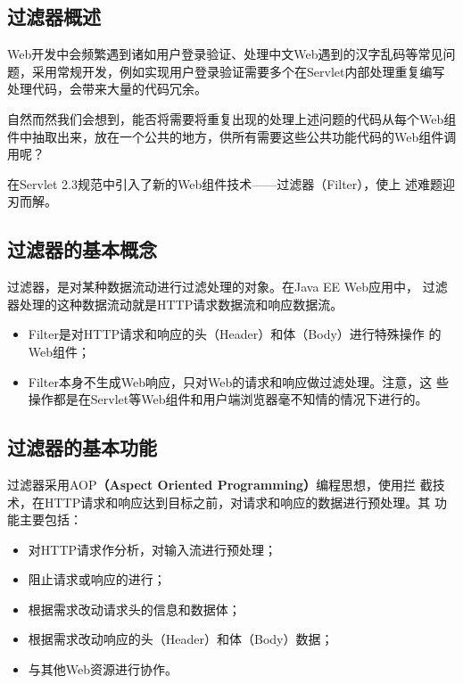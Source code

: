 \subsection{过滤器概述} 

Web开发中会频繁遇到诸如用户登录验证、处理中文Web遇到的汉字乱码等常见问
题，采用常规开发，例如实现用户登录验证需要多个在Servlet内部处理重复编写
处理代码，会带来大量的代码冗余。

自然而然我们会想到，能否将需要将重复出现的处理上述问题的代码从每个Web组
件中抽取出来，放在一个公共的地方，供所有需要这些公共功能代码的Web组件调
用呢？

在Servlet 2.3规范中引入了新的Web组件技术——{\hei 过滤器（Filter）}，使上
述难题迎刃而解。

\subsection{过滤器的基本概念}

{\hei 过滤器，是对某种数据流动进行过滤处理的对象。在Java EE Web应用中，
  过滤器处理的这种数据流动就是HTTP请求数据流和响应数据流。}

\begin{itemize}
\item Filter是对HTTP请求和响应的头（Header）和体（Body）进行特殊操作
  的Web组件；
\item Filter本身不生成Web响应，只对Web的请求和响应做过滤处理。注意，这
  些操作都是在Servlet等Web组件和用户端浏览器毫不知情的情况下进行的。
\end{itemize}

\subsection{过滤器的基本功能} 

过滤器采用AOP{\bf\Red （Aspect Oriented Programming）}编程思想，使用拦
截技术，在HTTP请求和响应达到目标之前，对请求和响应的数据进行预处理。其
功能主要包括：

\begin{itemize}
\item 对HTTP请求作分析，对输入流进行预处理；
\item 阻止请求或响应的进行；
\item 根据需求改动请求头的信息和数据体；
\item 根据需求改动响应的头（Header）和体（Body）数据；
\item 与其他Web资源进行协作。
\end{itemize}

